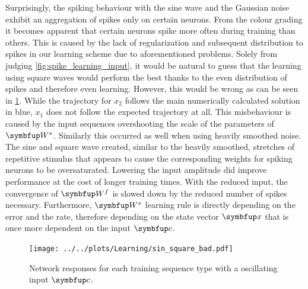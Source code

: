 Surprisingly, the spiking behaviour with the sine wave and the Gaussian noise exhibit an aggregation of spikes only on certain neurons. From the colour grading it becomes apparent that certain neurons spike more often during training than others. This is caused by the lack of regularization and subsequent distribution to spikes in our learning scheme due to aforementioned problems. Solely from judging \cref{fig:spike_learning_input}, it would be natural to guess that the learning using square waves would perform the best thanks to the even distribution of spikes and therefore even learning. However, this would be wrong as can be seen in \cref{fig:sin_square_bad}. While the trajectory for $x_2$ follows the main numerically calculated solution in blue, $x_1$ does not follow the expected trajectory at all. This misbehaviour is caused by the input sequences overshooting the scale of the parameters of $\bmu{W}^s$. Similarly this occurred as well when using heavily smoothed noise. The sine and square wave created, similar to the heavily smoothed, stretches of repetitive stimulus that appears to cause the corresponding weights for spiking neurons to be oversaturated. Lowering the input amplitude did improve performance at the cost of longer training times. With the reduced input, the convergence of $\bmu{W}^f$ is slowed down by the reduced number of spikes necessary. Furthermore, $\bmu{W}^s$ learning rule is directly depending on the error and the rate, therefore depending on the state vector $\bmu{x}$ that is once more dependent on the input $\bmu{c}$.
\begin{figure}
	\centering
	\texttt{[image: ../../plots/Learning/sin\_square\_bad.pdf]}
	\caption{Network responses for each training sequence type with a oscillating input $\bmu{c}$.}
	\label{fig:sin_square_bad}
\end{figure}

